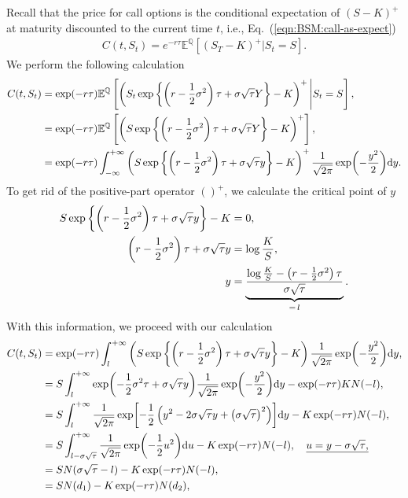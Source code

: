 \documentclass{book}
\begin{document}
Recall that the price for call options is the conditional expectation of $(S - K)^+$ at maturity discounted to the current time $t$, i.e., Eq.~(\ref{eqn:BSM:call-as-expect})
\begin{align*}
    C(t, S_t) = e^{-r \tau} \mathbb{E}^{\mathbb{Q}}[(S_T-K)^+ | S_t = S].
\end{align*}
We perform the following calculation
\begin{align*}
    C(t,S_t) &= \exp(-r\tau) \mathbb{E}^\mathbb{Q}\left[ \left({S_t} \exp \left\{ \left(r - \frac{1}{2} \sigma^2\right)\tau + \sigma  \sqrt{\tau} Y \right\} - K \right)^+ \Bigg| S_t = S\right], \notag\\
    &=  \exp(-r\tau) \mathbb{E}^\mathbb{Q}\left[ \left(S \exp \left\{ \left(r - \frac{1}{2} \sigma^2\right)\tau + \sigma  \sqrt{\tau} Y \right\} - K \right)^+ \right], \notag\\
    &= \exp(-r\tau) \int_{-\infty}^{+\infty} \left(S \exp \left\{ \left(r - \frac{1}{2} \sigma^2\right)\tau + \sigma  \sqrt{\tau} y \right\} - K \right)^+  \frac{1}{\sqrt{2\pi}}\exp({-\frac{y^2}{2}}) \dd y. \notag
\end{align*}
To get rid of the positive-part operator $()^+$, we calculate the critical point of $y$
\begin{align}
    S \exp \left\{ \left(r - \frac{1}{2} \sigma^2\right)\tau + \sigma  \sqrt{\tau} y \right\} - K &=0, \notag\\
    \left(r - \frac{1}{2} \sigma^2\right)\tau + \sigma  \sqrt{\tau} y &= \log \frac{K}{S}, \notag\\
    y &= \underbrace{\frac{\log \frac{K}{S} - \left(r - \frac{1}{2} \sigma^2\right)\tau} {\sigma \sqrt{\tau}}}_{ =\, l}.
\end{align}
With this information, we proceed with our calculation
\begin{align}
    C(t,S_t) &= \exp(-r\tau) \int_{l}^{+\infty} \left(S \exp \left\{ \left(r - \frac{1}{2} \sigma^2\right)\tau + \sigma  \sqrt{\tau} y \right\} - K \right) \frac{1}{\sqrt{2\pi}}\exp({-\frac{y^2}{2}}) \dd y, \notag\\
    &= S \int_{l}^{+\infty}  \exp (- \frac{1}{2} \sigma^2 \tau + \sigma \sqrt{\tau} y) \frac{1}{\sqrt{2\pi}}\exp({-\frac{y^2}{2}}) \dd y - \exp(-r\tau) KN(-l), \notag\\
    &= S \int_{l}^{+\infty} \frac{1}{\sqrt{2\pi}}\exp[{-\frac{1}{2}} \left(y^2 - 2\sigma  \sqrt{\tau} y + \big(\sigma\sqrt{\tau}\big)^2\right)] \dd y - K \exp(-r\tau) N(-l), \notag \\
    &= S \int_{l - \sigma\sqrt{\tau}}^{+\infty} \frac{1}{\sqrt{2\pi}}\exp(-\frac{1}{2} u^2) \dd u - K \exp(-r\tau) N(-l), \quad  \underline{u = y - \sigma\sqrt{\tau},} \notag\\
    &= S N (\sigma\sqrt{\tau} - l) - K \exp(-r\tau) N(-l), \notag \\
    &= S N (d_1) - K \exp(-r\tau) N(d_2), 
    \label{eqn:BS-Exp:call}
\end{align}
\end{document}

